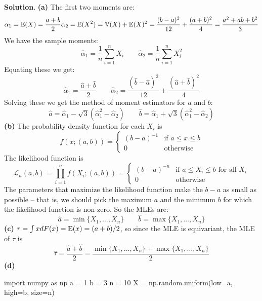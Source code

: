 \textbf{Solution}.
\textbf{(a)}
The first two moments are:
\[
\alpha_{1} = \operatorname{\mathbb{E}}(X) = \frac{a + b}{2} \\
\alpha_{2} = \operatorname{\mathbb{E}}(X^{2}) = \operatorname{\mathbb{V}}(X) + \operatorname{\mathbb{E}}(X)^{2} = \frac{(b - a)^{2}}{12} + \frac{(a + b)^{2}}{4}
= \frac{a^{2} + ab + b^{2}}{3}
\]
We have the sample moments:
\[
\hat{\alpha}_{1} = \frac{1}{n}\sum_{i=1}^{n} X_{i}
\quad \quad
\hat{\alpha}_{2} = \frac{1}{n}\sum_{i=1}^{n} X_{i}^{2}
\]
Equating these we get:
\[
\hat{\alpha}_{1} = \frac{\hat{a} + \hat{b}}{2}
\quad \quad
\hat{\alpha}_{2} = \frac{(\hat{b} - \hat{a})^{2}}{12} + \frac{(\hat{a} + \hat{b})^{2}}{4}
\]
Solving these we get the method of moment estimators for \(a\) and
\(b\):
\[
\hat{a} = \hat{\alpha}_{1} - \sqrt{3}(\hat{\alpha}_{1}^{2} - \hat{\alpha}_{2})
\quad \quad
\hat{b} = \hat{\alpha}_{1} + \sqrt{3}(\hat{\alpha}_{1}^{2} - \hat{\alpha}_{2})
\]
\textbf{(b)}
The probability density function for each \(X_{i}\) is
\[
f(x; (a, b)) = \begin{cases}
(b - a)^{-1} & \text{if } a \leq x \leq b \\
0 & \text{otherwise}
\end{cases}
\]
The likelihood function is
\[
\mathcal{L}_{n}(a, b) = \prod_{i=1}^{n} f(X_{i}; (a, b)) = \begin{cases}
(b-a)^{-n} & \text{if } a \leq X_{i} \leq b \text{ for all } X_{i}\\
0 & \text{otherwise}
\end{cases}
\]
The parameters that maximize the likelihood function make the \(b - a\)
as small as possible -- that is, we should pick the maximum \(a\) and
the minimum \(b\) for which the likelihood function is non-zero. So the
MLEs are:
\[
\hat{a} = \min \{X_{1}, \dots, X_{n} \}
\quad \quad
\hat{b} = \max \{X_{1}, \dots, X_{n} \}
\]
\textbf{(c)}
\(\tau = \int x dF(x) = \operatorname{\mathbb{E}}(x) = (a + b)/2\), so since the MLE is
equivariant, the MLE of \(\tau\) is
\[
\hat{\tau} = \frac{\hat{a} + \hat{b}}{2} = \frac{\min \{X_{1}, \dots, X_{n}\} + \max\{X_{1}, \dots, X_{n}\}}{2}
\]
\textbf{(d)}

\begin{python}
import numpy as np
a = 1
b = 3
n = 10
X = np.random.uniform(low=a, high=b, size=n)
\end{python}

